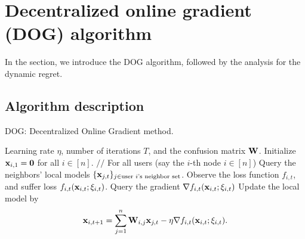 \documentclass{article}
\begin{document}
\section{Decentralized online gradient (DOG) algorithm} \label{sec:algorithm}
In the section, we introduce the DOG algorithm, followed by the analysis for the dynamic regret.
\subsection{Algorithm description}


\begin{algorithm}[!]
   \caption{\textsc{DOG}: Decentralized Online Gradient method.}
   \label{algo_DOG}
   \begin{algorithmic}[1]
   \REQUIRE Learning rate $\eta$, number of iterations $T$, and the confusion matrix ${\bf W}$.    
  \STATE Initialize ${\bf x}_{i,1} = {\bf 0}$ for all $i\in [n]$.    
            \STATE $\slash\slash$ For all users (say the $i$-th node $i\in[n]$)
                        \STATE \indent Query the neighbors' local models $\{{\bf x}_{j,t}\}_{j\in \text{user $i$'s neighbor set}}$.
            \STATE \indent Observe the loss function $f_{i,t}$, and suffer loss $f_{i,t}({\bf x}_{i,t};\xi_{i,t})$.
            \STATE \indent Query the gradient $\nabla f_{i,t}({\bf x}_{i,t};\xi_{i,t})$
            \STATE \indent Update the local model by 
            \[{\bf x}_{i,t+1} = \sum_{j=1}^n {\bf W}_{i,j}{\bf x}_{j,t} - \eta \nabla f_{i,t}({\bf x}_{i,t};\xi_{i,t}).\] 
       \ENDFOR
   \end{algorithmic}
\end{algorithm}
\end{document}
